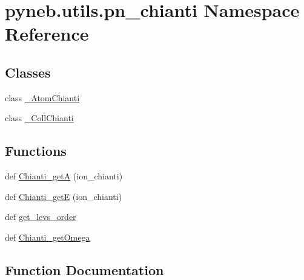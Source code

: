 \hypertarget{namespacepyneb_1_1utils_1_1pn__chianti}{}\section{pyneb.\+utils.\+pn\+\_\+chianti Namespace Reference}
\label{namespacepyneb_1_1utils_1_1pn__chianti}
\subsection*{Classes}
\begin{DoxyCompactItemize}
\item 
class \hyperlink{classpyneb_1_1utils_1_1pn__chianti_1_1___atom_chianti}{\+\_\+\+Atom\+Chianti}
\item 
class \hyperlink{classpyneb_1_1utils_1_1pn__chianti_1_1___coll_chianti}{\+\_\+\+Coll\+Chianti}
\end{DoxyCompactItemize}
\subsection*{Functions}
\begin{DoxyCompactItemize}
\item 
def \hyperlink{namespacepyneb_1_1utils_1_1pn__chianti_ae701b2adb22d5cde4fd8ae2967b55fd0}{Chianti\+\_\+get\+A} (ion\+\_\+chianti)
\item 
def \hyperlink{namespacepyneb_1_1utils_1_1pn__chianti_a9044db416b867ab604784eb0246c88e2}{Chianti\+\_\+get\+E} (ion\+\_\+chianti)
\item 
def \hyperlink{namespacepyneb_1_1utils_1_1pn__chianti_aa5ac8c15155a7a63ddaefa054349ea16}{get\+\_\+levs\+\_\+order}
\item 
def \hyperlink{namespacepyneb_1_1utils_1_1pn__chianti_a651b939729d0f5afb817a47a974bfaa1}{Chianti\+\_\+get\+Omega}
\end{DoxyCompactItemize}


\subsection{Function Documentation}
\hypertarget{namespacepyneb_1_1utils_1_1pn__chianti_ae701b2adb22d5cde4fd8ae2967b55fd0}{}
